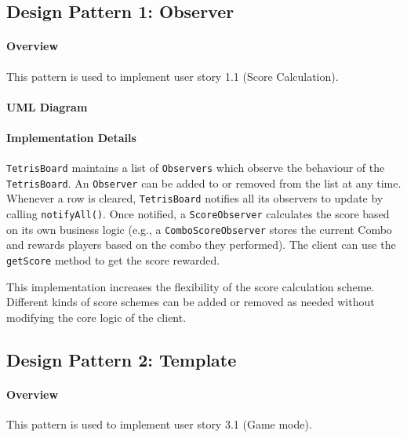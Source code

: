 \documentclass{article}
\begin{document}
\subsection{Design Pattern 1: Observer}

\paragraph{Overview}
This pattern is used to implement user story 1.1 (Score Calculation).

\paragraph{UML Diagram}\hfill

\begin{figure}[H]
    
\end{figure}

\paragraph{Implementation Details}

\verb`TetrisBoard` maintains a list of \verb`Observers` which observe the behaviour of the \verb`TetrisBoard`. An \verb`Observer` can be added to or removed from the list at any time. Whenever a row is cleared, \verb`TetrisBoard` notifies all its observers to update by calling \verb`notifyAll()`. Once notified, a \verb`ScoreObserver` calculates the score based on its own business logic (e.g., a \verb`ComboScoreObserver` stores the current Combo and rewards players based on the combo they performed). The client can use the \verb`getScore` method to get the score rewarded.

This implementation increases the flexibility of the score calculation scheme. Different kinds of score schemes can be added or removed as needed without modifying the core logic of the client.

\clearpage

\subsection{Design Pattern 2: Template}

\paragraph{Overview}
This pattern is used to implement user story 3.1 (Game mode).
\end{document}

